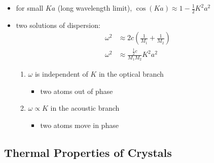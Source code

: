 \documentclass[a4paper,11pt,normalem]{article}
\begin{document}
\begin{itemize}
\begin{enumerate}
        \end{enumerate}
    \item for small \(Ka\) (long wavelength limit), \(\cos(Ka) \approx 1 - \frac{1}{2}K^2a^2\)
    \item two solutions of dispersion:
        \begin{align*}
            \omega^2 &\approx 2c\left(\frac{1}{M_1} + \frac{1}{M_2}\right) \\
            \omega^2 &\approx \frac{\frac{1}{2}c}{M_1M_2}K^2a^2
        \end{align*}
        \begin{enumerate}
            \item \(\omega\) is independent of \(K\) in the optical branch
                \begin{itemize}
                    \item two atoms out of phase
                \end{itemize}
            \item \(\omega \propto K\) in the acoustic branch
                \begin{itemize}
                    \item two atoms move in phase
                \end{itemize}
        \end{enumerate}
\end{itemize}

\subsection{Thermal Properties of Crystals}
\end{document}

